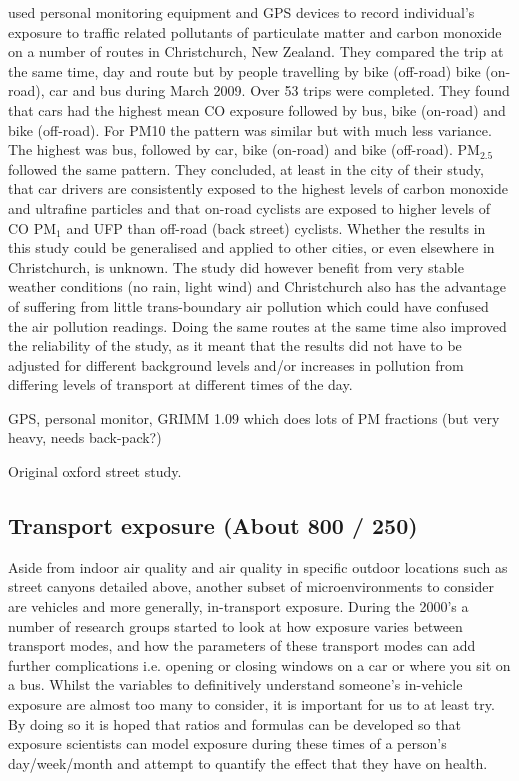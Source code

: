 \cite{Kingham2013} used personal monitoring equipment and GPS devices to record individual’s exposure to traffic related pollutants of particulate matter and carbon monoxide on a number of routes in Christchurch, New Zealand. They compared the trip at the same time, day and route but by people travelling by bike (off-road) bike (on-road), car and bus during March 2009. Over 53 trips were completed. They found that cars had the highest mean CO exposure followed by bus, bike (on-road) and bike (off-road). For PM10 the pattern was similar but with much less variance. The highest was bus, followed by car, bike (on-road) and bike (off-road). PM$_{2.5}$ followed the same pattern. They concluded, at least in the city of their study, that car drivers are consistently exposed to the highest levels of carbon monoxide and ultrafine particles and that on-road cyclists are exposed to higher levels of CO PM$_{1}$ and UFP than off-road (back street) cyclists. Whether the results in this study could be generalised and applied to other cities, or even elsewhere in Christchurch, is unknown. The study did however benefit from very stable weather conditions (no rain, light wind) and Christchurch also has the advantage of suffering from little trans-boundary air pollution which could have confused the air pollution readings. Doing the same routes at the same time also improved the reliability of the study, as it meant that the results did not have to be adjusted for different background levels and/or increases in pollution from differing levels of transport at different times of the day.

\cite{Broich2011}
GPS, personal monitor, GRIMM 1.09 which does lots of PM fractions (but very heavy, needs back-pack?)

\cite{McCreanor2007}
Original oxford street study.


\subsection{Transport exposure (About 800 / 250)}
\label{subsec:transportexposure}

Aside from indoor air quality and air quality in specific outdoor locations such as street canyons detailed above, another subset of microenvironments to consider are vehicles and more generally, in-transport exposure. During the 2000’s a number of research groups started to look at how exposure varies between transport modes, and how the parameters of these transport modes can add further complications i.e. opening or closing windows on a car or where you sit on a bus. Whilst the variables to definitively understand someone’s in-vehicle exposure are almost too many to consider, it is important for us to at least try. By doing so it is hoped that ratios and formulas can be developed so that exposure scientists can model exposure during these times of a person’s day/week/month and attempt to quantify the effect that they have on health.

